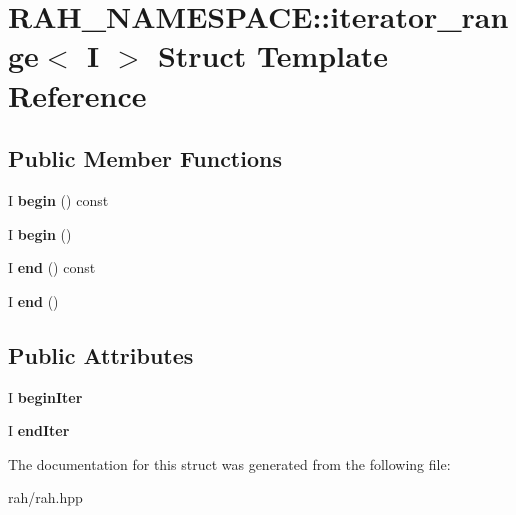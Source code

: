 \hypertarget{struct_r_a_h___n_a_m_e_s_p_a_c_e_1_1iterator__range}{}\section{R\+A\+H\+\_\+\+N\+A\+M\+E\+S\+P\+A\+CE\+::iterator\+\_\+range$<$ I $>$ Struct Template Reference}
\label{struct_r_a_h___n_a_m_e_s_p_a_c_e_1_1iterator__range}
\subsection*{Public Member Functions}
\begin{DoxyCompactItemize}
\item 
\mbox{\label{struct_r_a_h___n_a_m_e_s_p_a_c_e_1_1iterator__range_a8b83df28fa67ed57a5ea6785f63bee98}} 
I {\bfseries begin} () const
\item 
\mbox{\label{struct_r_a_h___n_a_m_e_s_p_a_c_e_1_1iterator__range_aa34dfea09501b4d1c85c8189b10d4234}} 
I {\bfseries begin} ()
\item 
\mbox{\label{struct_r_a_h___n_a_m_e_s_p_a_c_e_1_1iterator__range_a05e81ee6fc6378ea932c9b39b3fb5314}} 
I {\bfseries end} () const
\item 
\mbox{\label{struct_r_a_h___n_a_m_e_s_p_a_c_e_1_1iterator__range_a718f766d95770b507dc774db533e2f4e}} 
I {\bfseries end} ()
\end{DoxyCompactItemize}
\subsection*{Public Attributes}
\begin{DoxyCompactItemize}
\item 
\mbox{\label{struct_r_a_h___n_a_m_e_s_p_a_c_e_1_1iterator__range_aa902cec0300732ecb7510b44ba8bc379}} 
I {\bfseries begin\+Iter}
\item 
\mbox{\label{struct_r_a_h___n_a_m_e_s_p_a_c_e_1_1iterator__range_acededd2c5311addeab26de9f400dfbf3}} 
I {\bfseries end\+Iter}
\end{DoxyCompactItemize}


The documentation for this struct was generated from the following file\+:\begin{DoxyCompactItemize}
\item 
rah/rah.\+hpp\end{DoxyCompactItemize}
